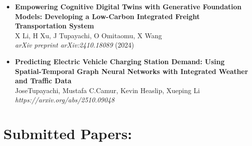 \documentclass[10pt, letterpaper]{article}
\begin{document}
    \begin{itemize}[left=0pt] 

        \item \textbf{Empowering Cognitive Digital Twins with Generative Foundation Models: Developing a Low-Carbon Integrated Freight Transportation System} \\
        X Li, H Xu, J Tupayachi, O Omitaomu, X Wang \\
        \textit{arXiv preprint arXiv:2410.18089} (2024) \\







            
    \item \textbf{Predicting Electric Vehicle Charging Station Demand: Using Spatial-Temporal Graph Neural Networks with Integrated Weather and Traffic Data}\\
    JoseTupayachi, Mustafa C.Camur, Kevin Heaslip, Xueping Li\\
    \textit{https://arxiv.org/abs/2510.09048}


    
        


    \end{itemize}


    \section*{Submitted Papers:}
\end{document}
